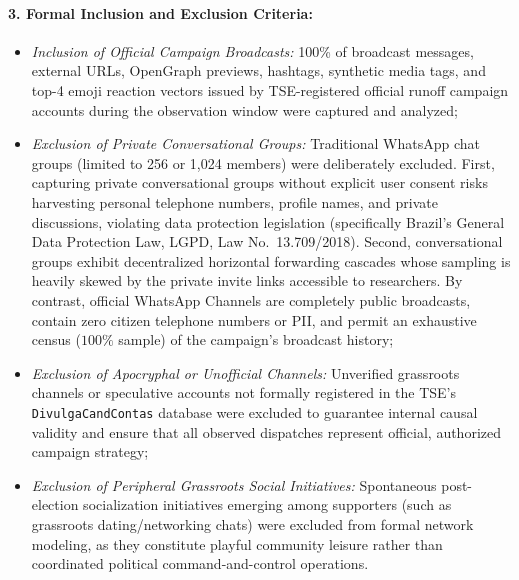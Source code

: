 \documentclass[preprint,12pt]{elsarticle}
\begin{document}
\paragraph{3. Formal Inclusion and Exclusion Criteria:}
\begin{itemize}
    \item \textit{Inclusion of Official Campaign Broadcasts:} 100\% of broadcast messages, external URLs, OpenGraph previews, hashtags, synthetic media tags, and top-4 emoji reaction vectors issued by TSE-registered official runoff campaign accounts during the observation window were captured and analyzed;
    \item \textit{Exclusion of Private Conversational Groups:} Traditional WhatsApp chat groups (limited to 256 or 1,024 members) were deliberately excluded. First, capturing private conversational groups without explicit user consent risks harvesting personal telephone numbers, profile names, and private discussions, violating data protection legislation (specifically Brazil's General Data Protection Law, LGPD, Law No.\ 13.709/2018). Second, conversational groups exhibit decentralized horizontal forwarding cascades whose sampling is heavily skewed by the private invite links accessible to researchers. By contrast, official WhatsApp Channels are completely public broadcasts, contain zero citizen telephone numbers or PII, and permit an exhaustive census ($100\%$ sample) of the campaign's broadcast history;
    \item \textit{Exclusion of Apocryphal or Unofficial Channels:} Unverified grassroots channels or speculative accounts not formally registered in the TSE's \texttt{DivulgaCandContas} database were excluded to guarantee internal causal validity and ensure that all observed dispatches represent official, authorized campaign strategy;
    \item \textit{Exclusion of Peripheral Grassroots Social Initiatives:} Spontaneous post-election socialization initiatives emerging among supporters (such as grassroots dating/networking chats) were excluded from formal network modeling, as they constitute playful community leisure rather than coordinated political command-and-control operations.
\end{itemize}
\end{document}
